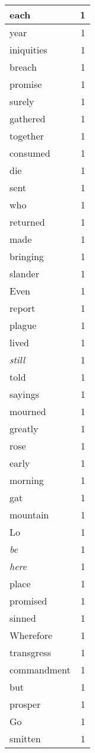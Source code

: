 \begin{center}
\begin{longtable}{l|r}
each & 1 \\ \hline
year & 1 \\ \hline
iniquities & 1 \\ \hline
breach & 1 \\ \hline
promise & 1 \\ \hline
surely & 1 \\ \hline
gathered & 1 \\ \hline
together & 1 \\ \hline
consumed & 1 \\ \hline
die & 1 \\ \hline
sent & 1 \\ \hline
who & 1 \\ \hline
returned & 1 \\ \hline
made & 1 \\ \hline
bringing & 1 \\ \hline
slander & 1 \\ \hline
Even & 1 \\ \hline
report & 1 \\ \hline
plague & 1 \\ \hline
lived & 1 \\ \hline
\emph{still} & 1 \\ \hline
told & 1 \\ \hline
sayings & 1 \\ \hline
mourned & 1 \\ \hline
greatly & 1 \\ \hline
rose & 1 \\ \hline
early & 1 \\ \hline
morning & 1 \\ \hline
gat & 1 \\ \hline
mountain & 1 \\ \hline
Lo & 1 \\ \hline
\emph{be} & 1 \\ \hline
\emph{here} & 1 \\ \hline
place & 1 \\ \hline
promised & 1 \\ \hline
sinned & 1 \\ \hline
Wherefore & 1 \\ \hline
transgress & 1 \\ \hline
commandment & 1 \\ \hline
but & 1 \\ \hline
prosper & 1 \\ \hline
Go & 1 \\ \hline
smitten & 1 \\ \hline

\end{longtable}
\end{center}

